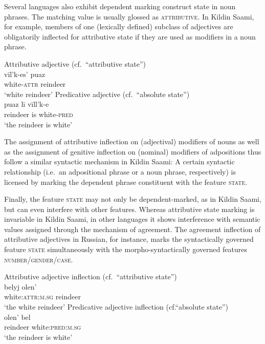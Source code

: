 Several languages also exhibit dependent marking construct state in noun phrases. The matching value is usually glossed as \textsc{attributive}. In Kildin Saami, for example, members of one (lexically defined) subclass of adjectives are obligatorily inflected for attributive state if they are used as modifiers in a noun phrase.
\begin{exe}
\ex\label{state np kildin}
\begin{xlist}
\ex	
{\rm Attributive adjective (cf.~“attributive state”)}\\
\gll 	vīl'k-es'		puaz\\
	white-\textsc{attr}	reindeer\\
\glt 	‘white reindeer’
\ex	
{\rm Predicative adjective (cf.~“absolute state”)}\\
\gll	puaz lī vīll'k-e\\
	reindeer is white-\textsc{pred}\\
\glt	‘the reindeer is white’
\end{xlist}
\end{exe}
The assignment of attributive inflection on (adjectival) modifiers of nouns as well as the assignment of genitive inflection on (nominal) modifiers of adpositions thus follow a similar syntactic mechanism in Kildin Saami: A certain syntactic relationship (i.e.~an adpositional phrase or a noun phrase, respectively) is licensed by marking the dependent phrase constituent with the feature \textsc{state}.

Finally, the feature \textsc{state} may not only be dependent-marked, as in Kildin Saami, but can even interfere with other features. Whereas attributive state marking is invariable in Kildin Saami, in other languages it shows interference with semantic values assigned through the mechanism of agreement. The agreement inflection of attributive adjectives in Russian, for instance, marks the syntactically governed feature \textsc{state} simultaneously with the morpho-syntactically governed features \textsc{number/gender/case}.
\begin{exe}
\ex\label{state np russian}
\begin{xlist}
\ex 
{\rm Attributive adjective inflection (cf.~“attributive state”)}\\
\gll 	belyj	olen'\\
	white:\textsc{attr:m.sg}	reindeer\\
\glt 	‘the white reindeer’
\ex	
{\rm Predicative adjective inflection (cf.“absolute state”)}\\
\gll	olen' bel\\
	reindeer white:\textsc{pred:m.sg}\\
\glt	‘the reindeer is white’
\end{xlist}
\end{exe}

